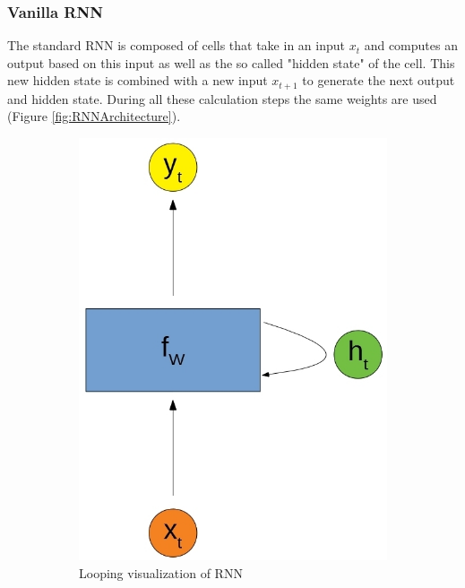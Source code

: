 \documentclass{article}
\begin{document}
\subsubsection{Vanilla RNN}
The standard RNN is composed of cells that take in an input \(x_t\) and computes an output based on this input as well as the so called "hidden state" of the cell. This new hidden state is combined with a new input \(x_{t+1}\) to generate the next output and hidden state. During all these calculation steps the same weights are used (Figure \ref{fig:RNNArchitecture}).
\begin{figure}[H]
    \centering
    \begin{subfigure}{1\textwidth}
        \centering
        \includegraphics[scale=0.2]{rsz_rnn_roll}
        \caption{Looping visualization of RNN}
    \end{subfigure}\\
    \begin{subfigure}{1\textwidth}

\end{subfigure}
\end{figure}
\end{document}
